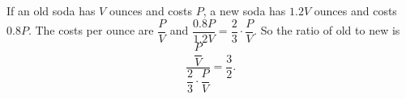 If an old soda has $V$ ounces and costs $P$, a new soda has $1.2V$ ounces and costs $0.8P$. The costs per ounce are $\dfrac PV$ and $\dfrac{0.8P}{1.2V}=\dfrac23\cdot\dfrac PV$. So the ratio of old to new is
\[\dfrac{\dfrac PV}{\dfrac23\cdot\dfrac PV}=\boxed{\dfrac32}.\]
